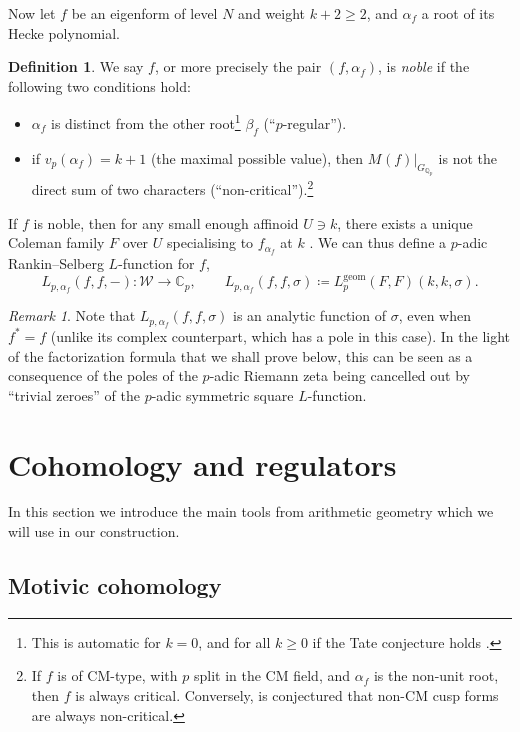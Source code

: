 \documentclass[11pt, a4paper, reqno]{amsart}
\theoremstyle{definition}
\newtheorem{definition}{Definition}[subsection]
\theoremstyle{plain}
\theoremstyle{remark}
\newtheorem*{remark}{Remark}
\DeclareMathOperator{\et}{\acute{e}t}
\newcommand{\numberset}{\mathbb}
\newcommand{\C}{\numberset{C}}
\newcommand{\Q}{\numberset{Q}}
\newcommand{\Weight}{\mathcal{W}}
\newcommand{\Lgeom}{L_p^{\mathrm{geom}}}
\renewcommand{\ge}{\geqslant}
\begin{document}
  Now let $f$ be an eigenform of level $N$ and weight $k + 2 \ge 2$, and $\alpha_f$ a root of its Hecke polynomial. 
  
  \begin{definition}
  \label{def:noble}
   We say $f$, or more precisely the pair $(f, \alpha_f)$, is \emph{noble} if the following two conditions hold:
   \begin{itemize}
   \item $\alpha_f$ is distinct from the other root\footnote{This is automatic for $k = 0$, and for all $k \ge 0$ if the Tate conjecture holds \cite{colemanedixhoven98}.} $\beta_f$ (``$p$-regular'').
   \item if $v_p(\alpha_f) = k + 1$ (the maximal possible value), then $M_{\et}(f)|_{G_{\Q_p}}$ is not the direct sum of two characters (``non-critical'').\footnote{If $f$ is of CM-type, with $p$ split in the CM field, and $\alpha_f$ is the non-unit root, then $f$ is always critical. Conversely, is conjectured that non-CM cusp forms are always non-critical.}
   \end{itemize}
  \end{definition}

  If $f$ is noble, then for any small enough affinoid $U \ni k$, there exists a unique Coleman family $F$ over $U$ specialising to $f_{\alpha_f}$ at $k$ \cite[Theorem~4.6.4]{loefflerzerbes16}. We can thus define a $p$-adic Rankin--Selberg $L$-function for $f$,
  \[ L_{p, \alpha_f}(f, f, -) : \Weight \to \C_p, \qquad L_{p, \alpha_f}(f, f, \sigma) \coloneqq \Lgeom(F, F)(k, k, \sigma).\]

  \begin{remark}
   Note that $L_{p, \alpha_f}(f, f, \sigma)$ is an analytic function of $\sigma$, even when $f^* = f$ (unlike its complex counterpart, which has a pole in this case). In the light of the factorization formula that we shall prove below, this can be seen as a consequence of the poles of the $p$-adic Riemann zeta being cancelled out by ``trivial zeroes'' of the $p$-adic symmetric square $L$-function.
  \end{remark}

\section{Cohomology and regulators}

 In this section we introduce the main tools from arithmetic geometry which we will use in our construction.

 \subsection{Motivic cohomology}
\end{document}
